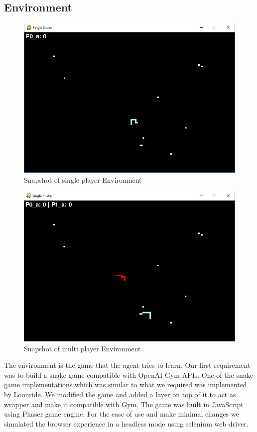 \documentclass[conference,10pt]{IEEEtran}
\begin{document}
	\subsection{Environment}
	\begin{figure}[]
		
		\includegraphics[width = \linewidth]{plot/single.jpeg}
		\caption{Snapshot of single player Environment}
		\label{se}
		
	\end{figure}
	\begin{figure}[]
		
		\includegraphics[width = \linewidth]{plot/multi.jpeg}
		\caption{Snapshot of multi player Environment}
		\label{me}
		
	\end{figure}
	The environment is the game that the agent tries to learn. Our first requirement was to build a snake game compatible with OpenAI Gym APIs. One of the snake game implementations which was similar to what we required was implemented by Loonride\cite{sd4}. We modified the game and added a layer on top of it to act as wrapper and make it compatible with Gym. The game was built in JavaScript using Phaser game engine. For the ease of use and make minimal changes we simulated the browser experience in a headless mode using selenium web driver.
\end{document}
